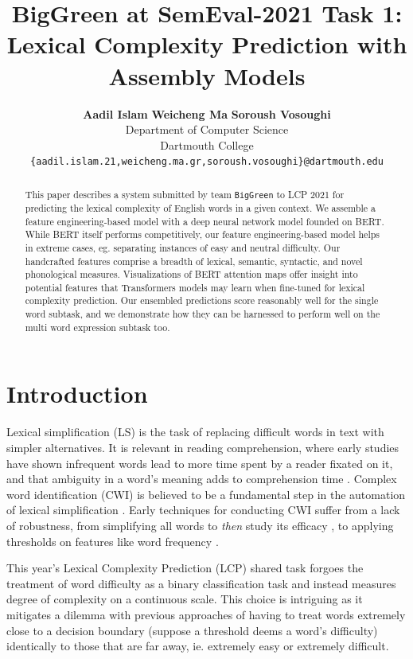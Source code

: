 \documentclass[11pt,a4paper]{article}
\title{BigGreen at SemEval-2021 Task 1: \\
Lexical Complexity Prediction with Assembly Models}
\author{
  \textbf{Aadil Islam}\normalfont{,} \textbf{Weicheng Ma}\normalfont{,} \textbf{Soroush Vosoughi}\\
  Department of Computer Science\\
  Dartmouth College\\
  \texttt{\{aadil.islam.21,weicheng.ma.gr,soroush.vosoughi\}@dartmouth.edu}
}
\date{}
\begin{document}
\maketitle

\begin{abstract}
  This paper describes a system submitted by team \texttt{BigGreen} to LCP 2021 for predicting the lexical complexity of English words in a given context. We assemble a feature engineering-based model with a deep neural network model founded on BERT. While BERT itself performs competitively, our feature engineering-based model helps in extreme cases, eg. separating instances of easy and neutral difficulty. Our handcrafted features comprise a breadth of lexical, semantic, syntactic, and novel phonological measures. Visualizations of BERT attention maps offer insight into potential features that Transformers models may learn when fine-tuned for lexical complexity prediction. Our ensembled predictions score reasonably well for the single word subtask, and we demonstrate how they can be harnessed to perform well on the multi word expression subtask too.
\end{abstract}

\section{Introduction}

Lexical simplification (LS) is the task of replacing difficult words in text with simpler alternatives. It is relevant in reading comprehension, where early studies have shown infrequent words lead to more time spent by a reader fixated on it, and that ambiguity in a word's meaning adds to comprehension time \citep{rayner1986lexical}. Complex word identification (CWI) is believed to be a fundamental step in the automation of lexical simplification \citep{shardlow2014out}. Early techniques for conducting CWI suffer from a lack of robustness, from simplifying all words to \textit{then} study its efficacy \citep{devlin1998use}, to applying thresholds on features like word frequency \citep{zeng2005text}. 

This year's Lexical Complexity Prediction (LCP) shared task \citep{shardlow2021semeval} forgoes the treatment of word difficulty as a binary classification task \citep{paetzold2016semeval, yimam2018report} and instead measures degree of complexity on a continuous scale. This choice is intriguing as it mitigates a dilemma with previous approaches of having to treat words extremely close to a decision boundary (suppose a threshold deems a word's difficulty) identically to those that are far away, ie. extremely easy or extremely difficult.
\end{document}
